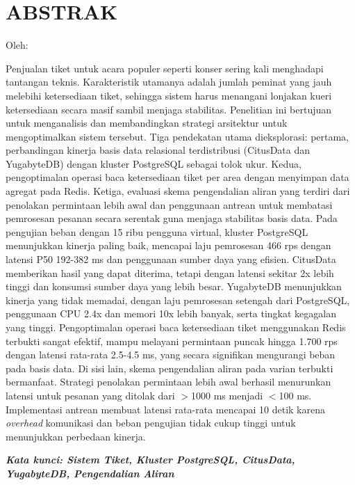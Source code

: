 \clearpage
\chapter*{ABSTRAK}
\begin{center}
  \center
  \begin{singlespace}
    \large\bfseries\MakeUppercase{\thetitle}

    \normalfont\normalsize
    Oleh:

    \bfseries \theauthor
  \end{singlespace}
\end{center}

\begin{singlespace}
  \small
  Penjualan tiket untuk acara populer seperti konser sering kali menghadapi tantangan teknis. Karakteristik utamanya adalah jumlah peminat yang jauh melebihi ketersediaan tiket, sehingga sistem harus menangani lonjakan kueri ketersediaan secara masif sambil menjaga stabilitas. Penelitian ini bertujuan untuk menganalisis dan membandingkan strategi arsitektur untuk mengoptimalkan sistem tersebut. Tiga pendekatan utama dieksplorasi: pertama, perbandingan kinerja basis data relasional terdistribusi (CitusData dan YugabyteDB) dengan kluster PostgreSQL sebagai tolok ukur. Kedua, pengoptimalan operasi baca ketersediaan tiket per area dengan menyimpan data agregat pada Redis. Ketiga, evaluasi skema pengendalian aliran yang terdiri dari penolakan permintaan lebih awal dan penggunaan antrean untuk membatasi pemrosesan pesanan secara serentak guna menjaga stabilitas basis data. Pada pengujian beban dengan 15 ribu pengguna virtual, kluster PostgreSQL menunjukkan kinerja paling baik, mencapai laju pemrosesan 466 rps dengan latensi P50 192-382 ms dan penggunaan sumber daya yang efisien. CitusData memberikan hasil yang dapat diterima, tetapi dengan latensi sekitar 2x lebih tinggi dan konsumsi sumber daya yang lebih besar. YugabyteDB menunjukkan kinerja yang tidak memadai, dengan laju pemrosesan setengah dari PostgreSQL, penggunaan CPU 2.4x dan memori 10x lebih banyak, serta tingkat kegagalan yang tinggi. Pengoptimalan operasi baca ketersediaan tiket menggunakan Redis terbukti sangat efektif, mampu melayani permintaan puncak hingga 1.700 rps dengan latensi rata-rata 2.5-4.5 ms, yang secara signifikan mengurangi beban pada basis data. Di sisi lain, skema pengendalian aliran pada varian terbukti bermanfaat. Strategi penolakan permintaan lebih awal berhasil menurunkan latensi untuk pesanan yang ditolak dari $>$1000 ms menjadi $<$100 ms. Implementasi antrean membuat latensi rata-rata mencapai 10 detik karena \textit{overhead} komunikasi dan beban pengujian tidak cukup tinggi untuk menunjukkan perbedaan kinerja.

  \textbf{\textit{Kata kunci: Sistem Tiket, Kluster PostgreSQL, CitusData, YugabyteDB, Pengendalian Aliran}}

\end{singlespace}
\clearpage